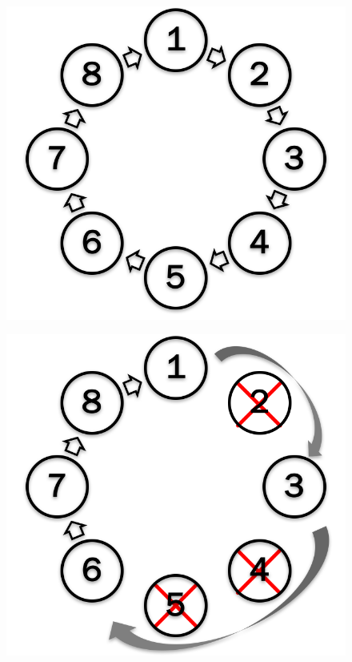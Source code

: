 \documentclass[sigconf]{acmart}
\begin{document}
\begin{figure}
\centering
\begin{minipage}{.23\textwidth}
  \centering
  \includegraphics[width=\linewidth]{ring_detector.png}
  \label{fig:Ring}
\end{minipage}%
\begin{minipage}{.23\textwidth}
  \centering
  \includegraphics[width=\linewidth]{reconnet_cross.png}
  \label{fig:Reconnect Ring}
\end{minipage}
\end{figure}
\end{document}
